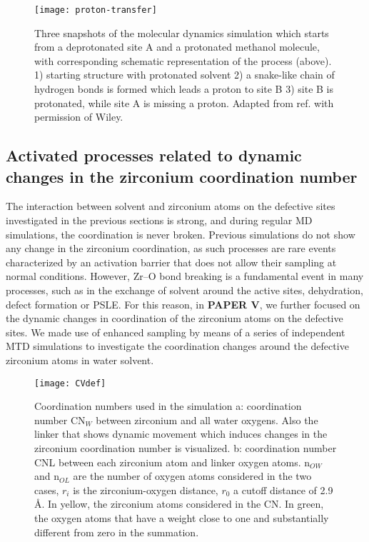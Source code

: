 \begin{figure}[!htbp]
	\centering
	\texttt{[image: proton-transfer]}
	\caption{Three snapshots of the molecular dynamics simulation which starts from a deprotonated site A and a protonated methanol molecule, with corresponding schematic representation of the process (above). 1) starting structure with protonated solvent 2) a snake-like chain of hydrogen bonds is formed which leads a proton to site B 3) site B is protonated, while site A is missing a proton. Adapted from ref. \cite{caratelli2018influence} with permission of Wiley.}
	\label{fig:proton-transfer}
\end{figure}

\subsection*{Activated processes related to dynamic changes in the zirconium coordination number}
The interaction between solvent and zirconium atoms on the defective sites investigated in the previous sections is strong, and during regular MD simulations, the coordination is never broken. Previous simulations do not show any change in the zirconium coordination, as such processes are rare events characterized by an activation barrier that does not allow their sampling at normal conditions. However, Zr--O bond breaking is a fundamental event in many processes, such as in the exchange of solvent around the active sites, dehydration, defect formation or PSLE. For this reason, in \textbf{PAPER V}, we further focused on the dynamic changes in coordination of the zirconium atoms on the defective sites. We made use of enhanced sampling by means of a series of independent MTD simulations to investigate the coordination changes around the defective zirconium atoms in water solvent. 
\npar
\begin{figure}[!htbp]
	\centering
	\texttt{[image: CVdef]}
	\caption{Coordination numbers used in the simulation a: coordination number CN$_W$ between zirconium and all water oxygens. Also the linker that shows dynamic movement which induces changes in the zirconium coordination number is visualized. b: coordination number CNL between each zirconium atom and linker oxygen atoms. n$_{OW}$ and n$_{OL}$ are the number of oxygen atoms considered in the two cases, $r_i$ is the zirconium-oxygen distance, $r_0$ a cutoff distance of 2.9 \AA. In yellow, the zirconium atoms considered in the CN. In green, the oxygen atoms that have a weight close to one and substantially different from zero in the summation.}
	\label{fig:CVdef}
\end{figure}
